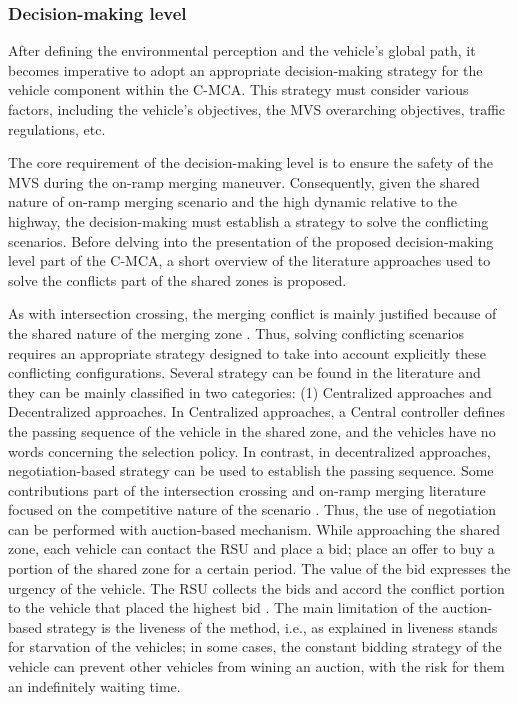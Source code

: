 \subsubsection{Decision-making level} \label{sec:decision_making}
After defining the environmental perception and the vehicle's global path, it becomes imperative to adopt an appropriate decision-making strategy for the vehicle component within the C-MCA. This strategy must consider various factors, including the vehicle's objectives, the MVS overarching objectives, traffic regulations, etc. 



The core requirement of the decision-making level is to ensure the safety of the MVS during the on-ramp merging maneuver. Consequently, given the shared nature of on-ramp merging scenario and the high dynamic relative to the highway, the decision-making must establish a strategy to solve the conflicting scenarios. Before delving into the presentation of the proposed decision-making level part of the C-MCA, a short overview of the literature approaches used to solve the conflicts part of the shared zones is proposed.



As with intersection crossing, the merging conflict is mainly justified because of the shared nature of the merging zone \cite{mariani2021coordination}. Thus, solving conflicting scenarios requires an appropriate strategy designed to take into account explicitly these conflicting configurations. Several strategy can be found in the literature and they can be mainly classified in two categories:  (1) Centralized approaches and Decentralized approaches. In Centralized approaches, a Central controller defines the passing sequence of the vehicle in the shared zone, and the vehicles have no words concerning the selection policy. In contrast, in decentralized approaches, negotiation-based strategy can be used to establish the passing sequence. Some contributions part of the intersection crossing and on-ramp merging literature focused on the competitive nature of the  scenario \cite{mariani2021coordination}. Thus, the use of negotiation can be performed with auction-based mechanism. While approaching the shared zone, each vehicle can contact the RSU and place a bid; place an offer to buy a portion of the shared zone for a certain period. The value of the bid expresses the urgency of the vehicle. The RSU collects the bids and accord the conflict portion to the vehicle that placed the highest bid \cite{carlino2013auction}\cite{cabri2019auction}\cite{vasirani2012market}. The main limitation of the auction-based strategy is the liveness of the method, i.e., as explained in  \cite{mariani2021coordination} liveness stands for starvation of the vehicles; in some cases, the constant bidding strategy of the vehicle can prevent other vehicles from wining an auction, with the risk for them an indefinitely waiting time. 



